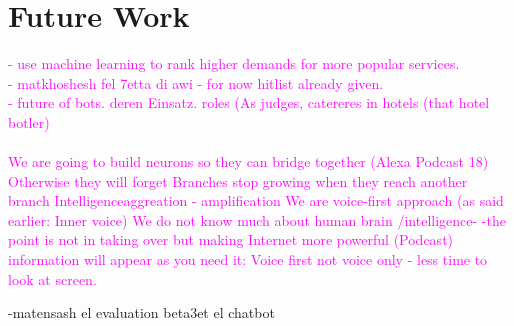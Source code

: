\section{Future Work}
\textcolor{magenta}{
- use machine learning to rank higher demands for more popular services.\\ 
- matkhoshesh fel 7etta di awi - for now hitlist already given.\\
- future of bots. deren Einsatz. roles (As judges, catereres in hotels (that hotel botler) \\
\\
We are going to build neurons so they can bridge together (Alexa Podcast 18)
Otherwise they will forget 
Branches stop growing when they reach another branch
Intelligenceaggreation - amplification 
We are voice-first approach (as said earlier: Inner voice)
We do not know much about human brain /intelligence-
-the point is not in taking over but making Internet more powerful (Podcast)
information will appear as you need it: 
Voice first not voice only - less time to look at screen. 
}

-matensash el evaluation beta3et el chatbot